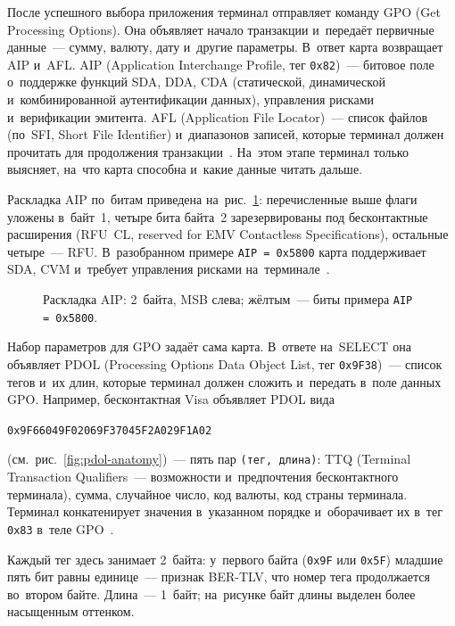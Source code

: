 После успешного выбора приложения терминал отправляет команду GPO (Get
Processing Options). Она объявляет начало транзакции и~передаёт первичные
данные~--- сумму, валюту, дату и~другие параметры. В~ответ карта возвращает AIP и~AFL.
AIP (Application Interchange Profile, тег \texttt{0x82})~--- битовое поле
о~поддержке функций SDA, DDA, CDA (статической, динамической
и~комбинированной аутентификации данных), управления рисками
и~верификации эмитента. AFL (Application File Locator)~--- список файлов
(по~SFI, Short File Identifier) и~диапазонов записей, которые терминал
должен прочитать для продолжения транзакции~\cite{emvco-book3}. На~этом этапе
терминал только выясняет, на~что карта способна и~какие данные читать дальше.

Раскладка AIP по~битам приведена на~рис.~\ref{fig:aip-anatomy}: перечисленные
выше флаги уложены в~байт~1, четыре бита байта~2 зарезервированы под
бесконтактные расширения (RFU~CL, reserved for EMV Contactless Specifications),
остальные четыре~--- RFU.
В~разобранном примере \texttt{AIP = 0x5800} карта поддерживает SDA, CVM
и~требует управления рисками на~терминале~\cite{emvco-book3}.

\begin{figure}[tbp]
  \centering
  \caption{Раскладка AIP: 2~байта, MSB слева; жёлтым~--- биты примера \texttt{AIP = 0x5800}.}\label{fig:aip-anatomy}
\end{figure}

Набор параметров для GPO задаёт сама карта. В~ответе на~SELECT она объявляет
PDOL (Processing Options Data Object List, тег
\texttt{0x9F38})~--- список тегов и~их длин, которые терминал должен сложить
и~передать в~поле данных GPO. Например, бесконтактная Visa объявляет PDOL вида
\begin{center}
  \small\texttt{0x9F66049F02069F37045F2A029F1A02}
\end{center}
\smallskip
\noindent (см.~рис.~\ref{fig:pdol-anatomy})~--- пять пар \texttt{(тег,
длина)}: TTQ (Terminal Transaction Qualifiers~--- возможности и~предпочтения
бесконтактного терминала), сумма, случайное число, код валюты, код страны
терминала. Терминал конкатенирует значения в~указанном порядке и~оборачивает их
в~тег \texttt{0x83} в~теле GPO~\cite{emvco-book3,visa-tadg}.

Каждый тег здесь занимает 2~байта: у~первого байта (\texttt{0x9F} или
\texttt{0x5F}) младшие пять бит равны единице~--- признак BER-TLV, что
номер тега продолжается во~втором байте. Длина~--- 1~байт; на~рисунке
байт длины выделен более насыщенным оттенком.

